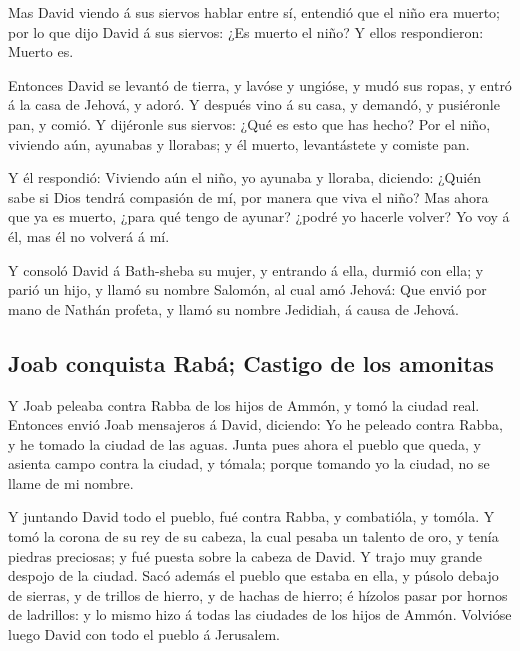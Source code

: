  Mas David viendo á sus siervos hablar entre sí, entendió
que el niño era muerto; por lo que dijo David á sus siervos: ¿Es muerto
el niño? Y ellos respondieron: Muerto es.

 Entonces David se levantó de tierra, y lavóse y ungióse,
y mudó sus ropas, y entró á la casa de Jehová, y adoró. Y después vino á
su casa, y demandó, y pusiéronle pan, y comió.  Y
dijéronle sus siervos: ¿Qué es esto que has hecho? Por el niño, viviendo
aún, ayunabas y llorabas; y él muerto, levantástete y comiste pan.

 Y él respondió: Viviendo aún el niño, yo ayunaba y
lloraba, diciendo: ¿Quién sabe si Dios tendrá compasión de mí, por
manera que viva el niño?  Mas ahora que ya es muerto,
¿para qué tengo de ayunar? ¿podré yo hacerle volver? Yo voy á él, mas él
no volverá á mí.

 Y consoló David á Bath-sheba su mujer, y entrando á
ella, durmió con ella; y parió un hijo, y llamó su nombre Salomón, al
cual amó Jehová:  Que envió por mano de Nathán profeta, y
llamó su nombre Jedidiah, á causa de Jehová.

\hypertarget{joab-conquista-rabuxe1-castigo-de-los-amonitas}{%
\subsection{Joab conquista Rabá; Castigo de los
amonitas}\label{joab-conquista-rabuxe1-castigo-de-los-amonitas}}

 Y Joab peleaba contra Rabba de los hijos de Ammón, y
tomó la ciudad real.  Entonces envió Joab mensajeros á
David, diciendo: Yo he peleado contra Rabba, y he tomado la ciudad de
las aguas.  Junta pues ahora el pueblo que queda, y
asienta campo contra la ciudad, y tómala; porque tomando yo la ciudad,
no se llame de mi nombre.

 Y juntando David todo el pueblo, fué contra Rabba, y
combatióla, y tomóla.  Y tomó la corona de su rey de su
cabeza, la cual pesaba un talento de oro, y tenía piedras preciosas; y
fué puesta sobre la cabeza de David. Y trajo muy grande despojo de la
ciudad.  Sacó además el pueblo que estaba en ella, y
púsolo debajo de sierras, y de trillos de hierro, y de hachas de hierro;
é hízolos pasar por hornos de ladrillos: y lo mismo hizo á todas las
ciudades de los hijos de Ammón. Volvióse luego David con todo el pueblo
á Jerusalem.


